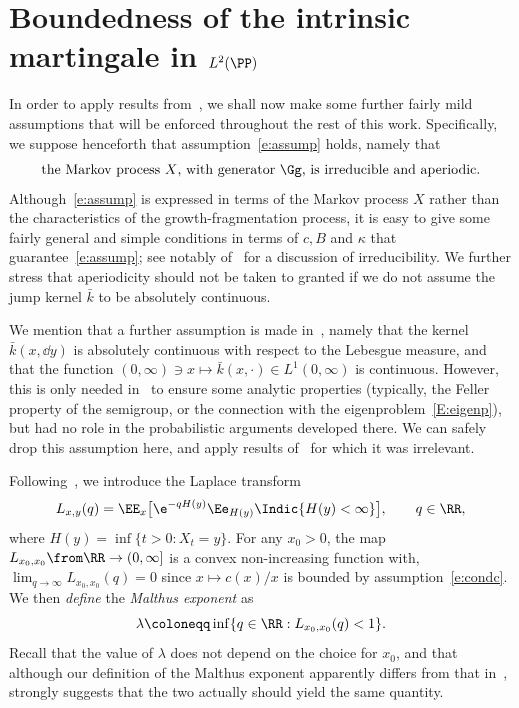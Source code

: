 \section{Boundedness of the intrinsic martingale in \texorpdfstring{$L^2(\PP)$}{L\textasciicircum 2(P)} }\label{section4}
In order to apply results from~\cite{BW,BeFK}, we shall now make some further fairly mild assumptions that will be enforced throughout the rest of this work. Specifically, we suppose henceforth that assumption~\eqref{e:assump} holds, namely that
\[
\text{the Markov process $X$, with generator $\Gg$, is irreducible and aperiodic.}
\]
Although~\eqref{e:assump} is expressed in terms of the Markov process $X$ rather than the characteristics of the growth-fragmentation process, it is easy to give some fairly general and simple conditions in terms of $c, B$ and $\kappa$ that guarantee~\eqref{e:assump}; see notably of~\cite[Lemma~3.1]{BeFK} for a discussion of irreducibility. We further stress that aperiodicity should not be taken to granted if we do not assume the jump kernel $\bar k$ to be absolutely continuous.

\begin{rema}
We mention that a further assumption is made in~\cite{BW,BeFK}, namely that the kernel $\bar k(x,\dd y)$ is absolutely continuous with respect to the Lebesgue measure, and that the function $(0,\infty) \ni x \mapsto \bar{k}(x,\cdot) \in L^1(0,\infty)$ is continuous. However, this is only needed in~\cite{BW} to ensure some analytic properties (typically, the Feller property of the semigroup, or the connection with the eigenproblem~\eqref{E:eigenp}), but had no role in the probabilistic arguments developed there.
We can safely drop this assumption here, and apply results of~\cite{BeFK,BW} for which it was irrelevant.
\end{rema}

Following~\cite{BW}, we introduce the Laplace transform
\[
L_{x,y}(q) = \EE_x\bigl[\e^{-qH(y)} \Ee_{H(y)} \Indic{H(y) < \infty} \bigr],\qquad q\in\RR,
\]
where $H(y) = \inf\{ t > 0: X_t = y \}$. For any $x_0>0$, the map $L_{x_0,x_0}\from \RR \to (0,\infty]$ is a convex non-increasing function with, $\lim_{q\to \infty}L_{x_0,x_0}(q)=0$ since $x\mapsto c(x)/x$ is bounded by assumption~\eqref{e:condc}. We then \emph{define} the \emph{Malthus exponent} as
\[
\lambda \coloneqq \inf\{q\in\RR: L_{x_0,x_0}(q)<1\}.
\]
Recall that the value of $\lambda$ does not depend on the choice for $x_0$, and that although our definition of the Malthus exponent apparently differs from that in~\cite[Section~5]{Jagers},  \cite[Proposition~3.3]{BW} strongly suggests that the two actually should yield the same quantity.


